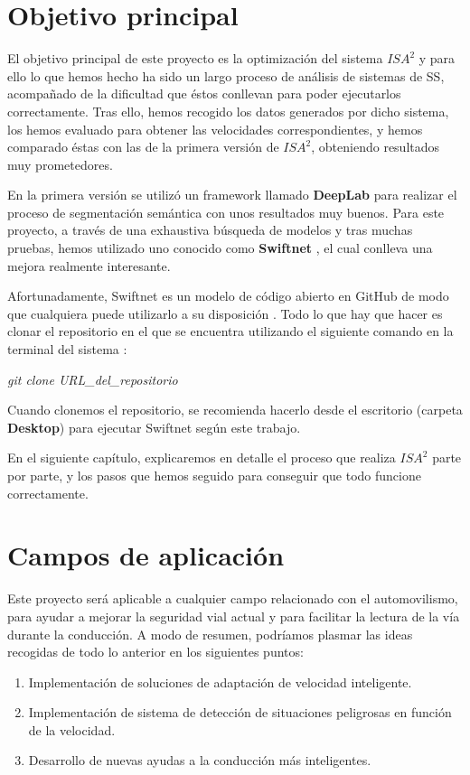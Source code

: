 \section{Objetivo principal}


El objetivo principal de este proyecto es la optimización del sistema $ISA^{2}$ y para ello lo que hemos hecho ha sido un largo proceso de análisis de sistemas de \ac{SS}, acompañado de la dificultad que éstos conllevan para poder ejecutarlos correctamente. Tras ello, hemos recogido los datos generados por dicho sistema, los hemos evaluado para obtener las velocidades correspondientes, y hemos comparado éstas con las de la primera versión de $ISA^{2}$, obteniendo resultados muy prometedores.


En la primera versión se utilizó un framework llamado \textbf{DeepLab} \cite{deeplab} para realizar el proceso de segmentación semántica con unos resultados muy buenos. Para este proyecto, a través de una exhaustiva búsqueda de modelos y tras muchas pruebas, hemos utilizado uno conocido como \textbf{Swiftnet} \cite{swiftnet}, el cual conlleva una mejora realmente interesante.

Afortunadamente, Swiftnet es un modelo de código abierto en GitHub de modo que cualquiera puede utilizarlo a su disposición \cite{github_swiftnet}. Todo lo que hay que hacer es clonar el repositorio en el que se encuentra utilizando el siguiente comando en la terminal del sistema \cite{clonar}:

\begin{center}
\textit{git clone URL\_del\_repositorio}
\end{center}

Cuando clonemos el repositorio, se recomienda hacerlo desde el escritorio (carpeta \textbf{Desktop}) para ejecutar Swiftnet según este trabajo.

En el siguiente capítulo, explicaremos en detalle el proceso que realiza $ISA^{2}$ parte por parte, y los pasos que hemos seguido para conseguir que todo funcione correctamente.

\section{Campos de aplicación}


Este proyecto será aplicable a cualquier campo relacionado con el automovilismo, para ayudar a mejorar la seguridad vial actual y para facilitar la lectura de la vía durante la conducción. A modo de resumen, podríamos plasmar las ideas recogidas de todo lo anterior en los siguientes puntos:
\begin{enumerate}	
	\item Implementación de soluciones de adaptación de velocidad inteligente.
	\item Implementación de sistema de detección de situaciones peligrosas en función de la velocidad.
	\item Desarrollo de nuevas ayudas a la conducción más inteligentes.
\end{enumerate}

